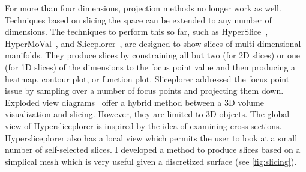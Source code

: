 For more than four dimensions, 
projection methods no longer work as well. Techniques based on slicing the
space can be extended to any number of dimensions. The techniques to perform
this so far, such as HyperSlice~\cite{Wijk:1993},
HyperMoVal~\cite{Piringer:2010}, and Sliceplorer~\cite{Torsney-Weir:2017a},
are designed to show slices of multi-dimensional manifolds.
They produce slices by
constraining all but two (for 2D slices) or one (for 1D slices) of the
dimensions to the focus point value and then producing a heatmap, contour plot,
or function plot. Sliceplorer addressed the focus point issue by sampling over
a number of focus points and projecting them down.  Exploded view
diagrams~\cite{Karpenko:2010} offer a hybrid method between a 3D volume
visualization and slicing.  However, they 
are limited to 3D objects. 
The global view of Hypersliceplorer is inspired by the idea of examining
cross sections. Hypersliceplorer also has a local
view which permits the user to look at a small number of self-selected slices.
I developed a method to produce slices based on a simplical mesh which
is very useful given a discretized surface (see \autoref{fig:slicing}). 

